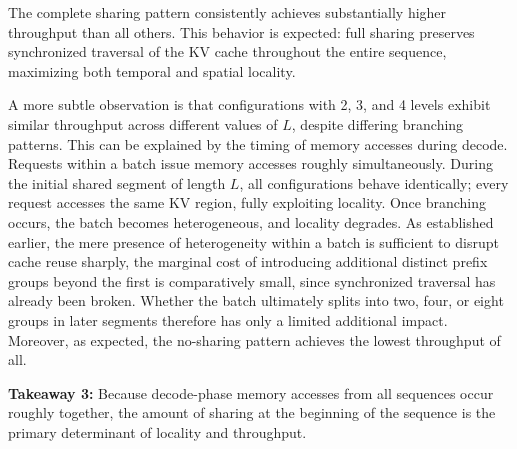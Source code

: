 The complete sharing pattern consistently achieves substantially higher throughput than all others. This behavior is expected: full sharing preserves synchronized traversal of the KV cache throughout the entire sequence, maximizing both temporal and spatial locality.

A more subtle observation is that configurations with 2, 3, and 4 levels exhibit similar throughput across different values of $L$, despite differing branching patterns. This can be explained by the timing of memory accesses during decode. Requests within a batch issue memory accesses roughly simultaneously. During the initial shared segment of length $L$, all configurations behave identically; every request accesses the same KV region, fully exploiting locality. Once branching occurs, the batch becomes heterogeneous, and locality degrades. As established earlier, the mere presence of heterogeneity within a batch is sufficient to disrupt cache reuse sharply, the marginal cost of introducing additional distinct prefix groups beyond the first is comparatively small, since synchronized traversal has already been broken. Whether the batch ultimately splits into two, four, or eight groups in later segments therefore has only a limited additional impact. Moreover, as expected, the no-sharing pattern achieves the lowest throughput of all.

\textbf{Takeaway 3:} Because decode-phase memory accesses from all sequences occur roughly together, the amount of sharing at the beginning of the sequence is the primary determinant of locality and throughput.



